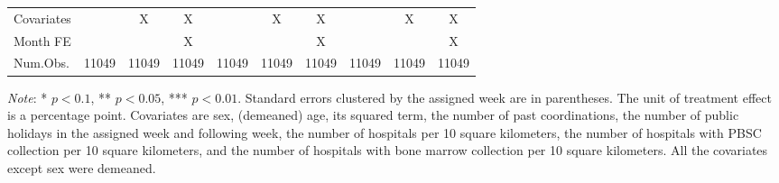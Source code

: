 \documentclass[12pt, a4paper]{article}
\begin{document}
\begin{table}[H]
\begin{threeparttable}
\begin{tabular}[t]{lccccccccc}
Covariates &  & X & X &  & X & X &  & X & X\\
Month FE &  &  & X &  &  & X &  &  & X\\
Num.Obs. & \num{11049} & \num{11049} & \num{11049} & \num{11049} & \num{11049} & \num{11049} & \num{11049} & \num{11049} & \num{11049}\\
\bottomrule
\end{tabular}
\begin{tablenotes}
\item \emph{Note}: * $p < 0.1$, ** $p < 0.05$, *** $p < 0.01$. Standard errors clustered by the assigned week are in parentheses. The unit of treatment effect is a percentage point. Covariates are sex, (demeaned) age, its squared term, the number of past coordinations, the number of public holidays in the assigned week and following week, the number of hospitals per 10 square kilometers, the number of hospitals with PBSC collection per 10 square kilometers, and the number of hospitals with bone marrow collection per 10 square kilometers. All the covariates except sex were demeaned.
\end{tablenotes}
\end{threeparttable}
\end{table}

\clearpage
\end{document}
